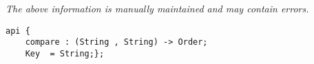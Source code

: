 \label{pkg:string\_key}

{\tiny \it The above information is manually maintained and may contain errors.}
\begin{verbatim}
api {
    compare : (String , String) -> Order;
    Key  = String;};
\end{verbatim}
